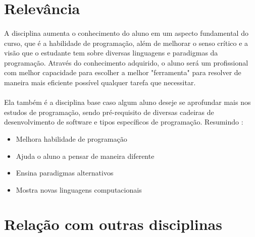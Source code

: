 \documentclass[a4paper]{article}
\begin{document}
\section{Relevância}

\paragraph{} A disciplina aumenta o conhecimento do aluno em um aspecto fundamental do curso, que é a habilidade de programação, além de melhorar o senso crítico e a visão que o estudante tem sobre diversas linguagens e paradigmas da programação. Através do conhecimento adquirido, o aluno será um profissional com melhor capacidade para escolher a melhor "ferramenta" para resolver de maneira mais eficiente possível qualquer tarefa que necessitar.

\paragraph{} Ela também é a disciplina base caso algum aluno deseje se aprofundar mais nos estudos de programação, sendo pré-requisito de diversas cadeiras de desenvolvimento de software e tipos específicos de programação. Resumindo :

\begin{itemize}
\item Melhora habilidade de programação
\item Ajuda o aluno a pensar de maneira diferente
\item Ensina paradigmas alternativos
\item Mostra novas linguagens computacionais
\end{itemize}

\section{Relação com outras disciplinas}
\end{document}
